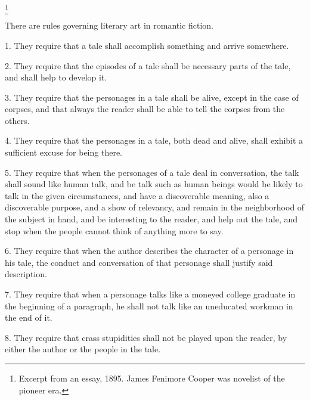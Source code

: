 \documentclass[../interior-demo.tex]{subfiles}
\begin{document}
\begin{upperpage}
\footnote{Excerpt from an essay, 1895. James Fenimore Cooper was
 novelist of the pioneer era.}
\end{upperpage}
There are rules governing literary art in romantic fiction.

1. They require that a tale shall accomplish something and arrive
somewhere.

2. They require that the episodes of a tale shall be necessary parts of
the tale, and shall help to develop it.

3. They require that the personages in a tale shall be alive, except in
the case of corpses, and that always the reader shall be able to tell
the corpses from the others.

4. They require that the personages in a tale, both dead and alive,
shall exhibit a sufficient excuse for being there.

5. They require that when the personages of a tale deal in conversation,
the talk shall sound like human talk, and be talk such as human
beings would be likely to talk in the given circumstances, and have
a discoverable meaning, also a discoverable purpose, and a show of
relevancy, and remain in the neighborhood of the subject in hand, and
be interesting to the reader, and help out the tale, and stop when the
people cannot think of anything more to say.

6. They require that when the author describes the character of a
personage in his tale, the conduct and conversation of that personage
shall justify said description.

7. They require that when a personage talks like a moneyed college
graduate in the beginning of a paragraph, he shall not talk like an uneducated
workman in the end of it.

8. They require that crass stupidities shall not be played upon the
reader, by either the author or the people in the tale.
\end{document}
